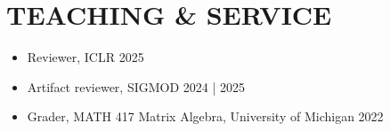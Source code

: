\documentclass[a4paper,9pt]{extarticle}
\begin{document}
\section*{TEACHING \& SERVICE}
\begin{itemize}
    \item Reviewer, ICLR \hfill 2025
    \item Artifact reviewer, SIGMOD \hfill 2024 | 2025
    \item Grader, MATH 417 Matrix Algebra, University of Michigan \hfill 2022
\end{itemize}
\end{document}
